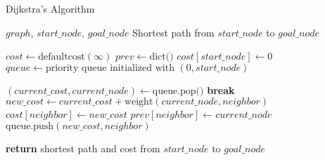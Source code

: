 \begin{algorithm}[H]
  \caption{Dijkstra's Algorithm}
  \label{alg:dijkstra}
  \begin{algorithmic}[1]
  \REQUIRE $graph$, $start\_node$, $goal\_node$
  \ENSURE Shortest path from $start\_node$ to $goal\_node$
  
  \STATE $cost \gets \text{defaultcost}(\infty)$ 
  \STATE $prev \gets \text{dict()}$ 
  \STATE $cost[start\_node] \gets 0$
  \STATE $queue \gets \text{priority queue initialized with } (0, start\_node)$
  
      \STATE $(current\_cost, current\_node) \gets \text{queue.pop()}$
          \STATE \textbf{break}
      \ENDIF
          \STATE $new\_cost \gets current\_cost + \text{weight}(current\_node, neighbor)$
              \STATE $cost[neighbor] \gets new\_cost$
              \STATE $prev[neighbor] \gets current\_node$
              \STATE $\text{queue.push}(new\_cost, neighbor)$
          \ENDIF
      \ENDFOR
  \ENDWHILE
  
  \STATE \textbf{return} shortest path and cost from $start\_node$ to $goal\_node$
  \end{algorithmic}
\end{algorithm}
  

